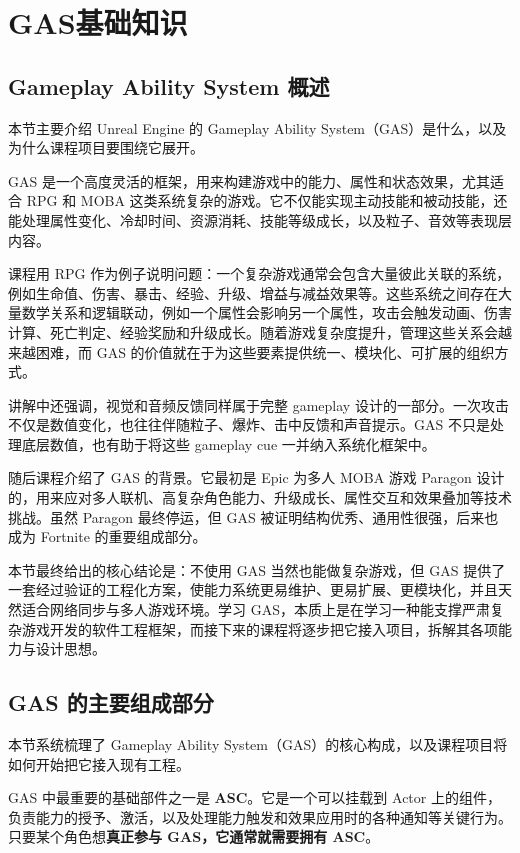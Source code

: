 \chapter{GAS基础知识}
\section{Gameplay Ability System 概述}

本节主要介绍 Unreal Engine 的 Gameplay Ability System（GAS）是什么，以及为什么课程项目要围绕它展开。

GAS 是一个高度灵活的框架，用来构建游戏中的能力、属性和状态效果，尤其适合 RPG 和 MOBA 这类系统复杂的游戏。它不仅能实现主动技能和被动技能，还能处理属性变化、冷却时间、资源消耗、技能等级成长，以及粒子、音效等表现层内容。

课程用 RPG 作为例子说明问题：一个复杂游戏通常会包含大量彼此关联的系统，例如生命值、伤害、暴击、经验、升级、增益与减益效果等。这些系统之间存在大量数学关系和逻辑联动，例如一个属性会影响另一个属性，攻击会触发动画、伤害计算、死亡判定、经验奖励和升级成长。随着游戏复杂度提升，管理这些关系会越来越困难，而 GAS 的价值就在于为这些要素提供统一、模块化、可扩展的组织方式。

讲解中还强调，视觉和音频反馈同样属于完整 gameplay 设计的一部分。一次攻击不仅是数值变化，也往往伴随粒子、爆炸、击中反馈和声音提示。GAS 不只是处理底层数值，也有助于将这些 gameplay cue 一并纳入系统化框架中。

随后课程介绍了 GAS 的背景。它最初是 Epic 为多人 MOBA 游戏 Paragon 设计的，用来应对多人联机、高复杂角色能力、升级成长、属性交互和效果叠加等技术挑战。虽然 Paragon 最终停运，但 GAS 被证明结构优秀、通用性很强，后来也成为 Fortnite 的重要组成部分。

本节最终给出的核心结论是：不使用 GAS 当然也能做复杂游戏，但 GAS 提供了一套经过验证的工程化方案，使能力系统更易维护、更易扩展、更模块化，并且天然适合网络同步与多人游戏环境。学习 GAS，本质上是在学习一种能支撑严肃复杂游戏开发的软件工程框架，而接下来的课程将逐步把它接入项目，拆解其各项能力与设计思想。
\section{GAS 的主要组成部分}

本节系统梳理了 Gameplay Ability System（GAS）的核心构成，以及课程项目将如何开始把它接入现有工程。

GAS 中最重要的基础部件之一是 \textbf{ASC}。它是一个可以挂载到 Actor 上的组件，负责能力的授予、激活，以及处理能力触发和效果应用时的各种通知等关键行为。只要某个角色想\textbf{真正参与 GAS，它通常就需要拥有 ASC}。

